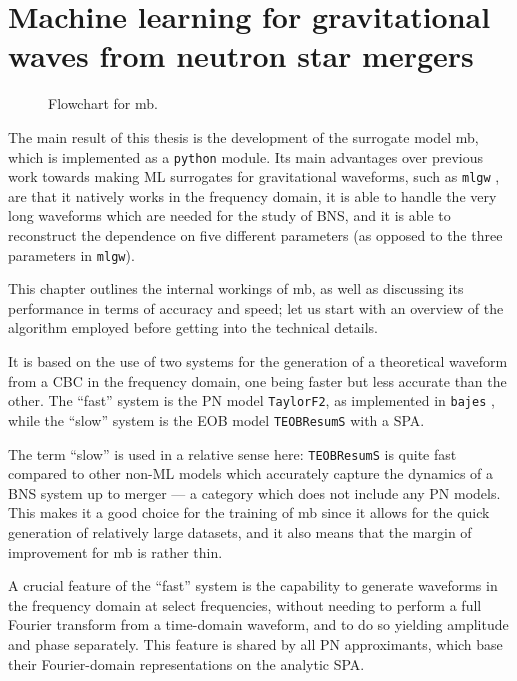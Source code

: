 \documentclass[main.tex]{subfiles}
\begin{document}
\chapter{Machine learning for gravitational waves from neutron star mergers} \label{chap:mlgw-bns}

\begin{figure}[ht]
\centering

\caption{Flowchart for \ac{mb}.}
\label{fig:flowchart}
\end{figure}

\newpage

The main result of this thesis is the development of the surrogate model \ac{mb}, which is implemented as a \texttt{python} module. 
Its main advantages over previous work towards making \ac{ML} surrogates for gravitational waveforms, such as \texttt{mlgw} \cite[]{schmidtMachineLearningGravitational2020}, are that it natively works in the frequency domain, it is able to handle the very long waveforms which are needed for the study of \ac{BNS}, and it is able to reconstruct the dependence on five different parameters (as opposed to the three parameters in \texttt{mlgw}).

This chapter outlines the internal workings of \ac{mb}, as well as discussing its performance in terms of accuracy and speed;
let us start with an overview of the algorithm employed before getting into the technical details. 

It is based on the use of two systems for the generation of a theoretical waveform from a \ac{CBC} in the frequency domain, one being faster but less accurate than the other.
The ``fast'' system is the \ac{PN} model \texttt{TaylorF2}, as implemented in \texttt{bajes} \cite[]{breschiTtBajesBayesian2021}, while the ``slow'' system is the \ac{EOB} model \texttt{TEOBResumS} with a \ac{SPA}. 

The term ``slow'' is used in a relative sense here: \texttt{TEOBResumS} is quite fast compared to other non-\ac{ML} models which accurately capture the dynamics of a \ac{BNS} system up to merger --- a category which does not include any \ac{PN} models.
This makes it a good choice for the training of \ac{mb} since it allows for the quick generation of relatively large datasets, and it also means that the margin of improvement for \ac{mb} is rather thin.

A crucial feature of the ``fast'' system is the capability to generate waveforms in the frequency domain at select frequencies, without needing to perform a full Fourier transform from a time-domain waveform, and to do so yielding amplitude and phase separately.
This feature is shared by all \ac{PN} approximants, which base their Fourier-domain representations on the analytic \ac{SPA}.
\end{document}
